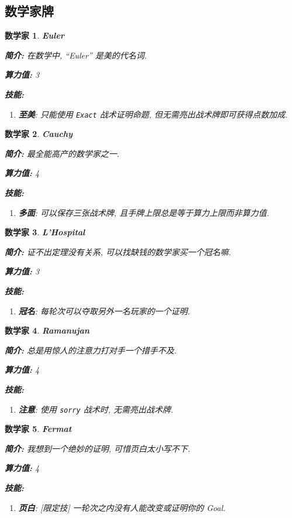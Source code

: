 \documentclass[UTF8]{ctexart}
\DeclareMathOperator{\0}{\mathbf{0}}                    %
\newcommand{\<}{\langle}
\renewcommand{\>}{\rangle}                              %
\newenvironment{cxmp_box}{
    \begin{tcolorbox}[enhanced, colback=cxmp_red2, boxrule=0pt, frame hidden,
        borderline west={0.7mm}{0.1mm}{cxmp_red1},breakable]
    }
    {\end{tcolorbox}}
\theoremstyle{MyStyle} %
\newtheorem{mathematician}{数学家}
\newenvironment{hero}[3]
{
    \begin{cxmp_box}
        \begin{mathematician}
            \textbf{#1}

            \textbf{简介: }#2
            
            \textbf{算力值: }#3

            \textbf{技能: }
}
{
        \end{mathematician}
    \end{cxmp_box}
}
\newcommand*{\lean}[1]{\texttt{\color{blue}#1}}
\begin{document}
    \subsection{数学家牌}
        
        \begin{hero}
            {Euler}
            {在数学中, ``Euler'' 是美的代名词. }
            {3}
            \begin{enumerate}
                \item \textbf{至美}: 只能使用 \lean{Exact} 战术证明命题, 但无需亮出战术牌即可获得点数加成. 
            \end{enumerate}
        \end{hero}

        \begin{hero}
            {Cauchy}
            {最全能高产的数学家之一. }
            {4}
            \begin{enumerate}
                \item \textbf{多面}: 可以保存三张战术牌, 且手牌上限总是等于算力上限而非算力值. 
            \end{enumerate}
        \end{hero}

        \begin{hero}
            {L'Hospital}
            {证不出定理没有关系, 可以找缺钱的数学家买一个冠名嘛. }
            {3}
            \begin{enumerate}
                \item \textbf{冠名}: 每轮次可以夺取另外一名玩家的一个证明. 
            \end{enumerate}
        \end{hero}

        \begin{hero}
            {Ramanujan}
            {总是用惊人的注意力打对手一个措手不及. }
            {4}
            \begin{enumerate}
                \item \textbf{注意}: 使用 \texttt{\color{red}sorry} 战术时, 无需亮出战术牌. 
            \end{enumerate}
        \end{hero}

        \begin{hero}
            {Fermat}
            {我想到一个绝妙的证明, 可惜页白太小写不下. }
            {4}
            \begin{enumerate}
                \item \textbf{页白}: [限定技] 一轮次之内没有人能改变或证明你的 Goal. 
            \end{enumerate}
        \end{hero}
\end{document}
